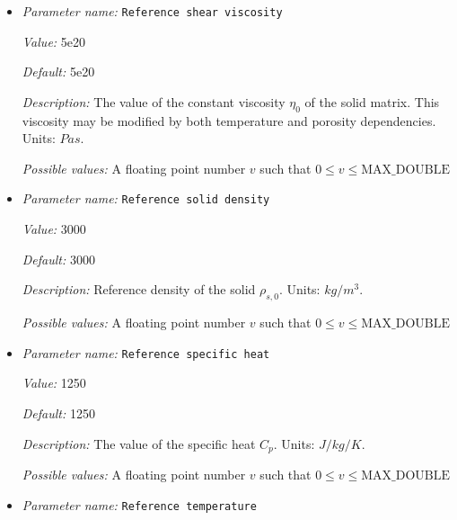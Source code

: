 \begin{itemize}
{\it Value:} 1e-8


{\it Default:} 1e-8


{\it Description:} Reference permeability of the solid host rock.Units: $m^2$.


{\it Possible values:} A floating point number $v$ such that $-\text{MAX\_DOUBLE} \leq v \leq \text{MAX\_DOUBLE}$
\item {\it Parameter name:} {\tt Reference shear viscosity}
\label{parameters:Material model/Melt simple/Reference shear viscosity}


{\it Value:} 5e20


{\it Default:} 5e20


{\it Description:} The value of the constant viscosity $\eta_0$ of the solid matrix. This viscosity may be modified by both temperature and porosity dependencies. Units: $Pa s$.


{\it Possible values:} A floating point number $v$ such that $0 \leq v \leq \text{MAX\_DOUBLE}$
\item {\it Parameter name:} {\tt Reference solid density}
\label{parameters:Material model/Melt simple/Reference solid density}


{\it Value:} 3000


{\it Default:} 3000


{\it Description:} Reference density of the solid $\rho_{s,0}$. Units: $kg/m^3$.


{\it Possible values:} A floating point number $v$ such that $0 \leq v \leq \text{MAX\_DOUBLE}$
\item {\it Parameter name:} {\tt Reference specific heat}
\label{parameters:Material model/Melt simple/Reference specific heat}


{\it Value:} 1250


{\it Default:} 1250


{\it Description:} The value of the specific heat $C_p$. Units: $J/kg/K$.


{\it Possible values:} A floating point number $v$ such that $0 \leq v \leq \text{MAX\_DOUBLE}$
\item {\it Parameter name:} {\tt Reference temperature}
\label{parameters:Material model/Melt simple/Reference temperature}



\end{itemize}

